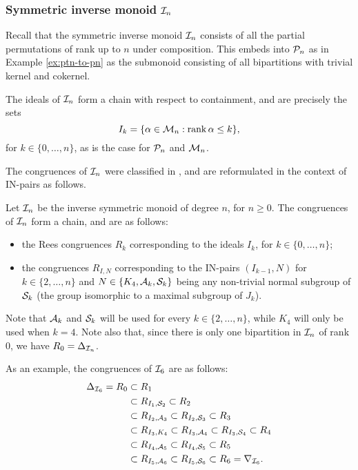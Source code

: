 \subsubsection{Symmetric inverse monoid $\mathcal{I}_n$}
Recall that the symmetric inverse monoid $\mathcal{I}_n$ consists of all the partial
permutations of rank up to $n$ under composition.  This embeds into $\mathcal{P}_n$ as
in Example \ref{ex:ptn-to-pn} as the submonoid consisting of all bipartitions
with trivial kernel and cokernel.

The ideals of $\mathcal{I}_n$ form a chain with respect to containment, and are precisely
the sets $$I_k=\{\alpha \in \mathcal{M}_n : \operatorname{rank} \alpha \leq k\},$$ for
$k \in \{0, \ldots, n\}$, as is the case for $\mathcal{P}_n$ and $\mathcal{M}_n$.

The congruences of $\mathcal{I}_n$ were classified in \cite{liber_1953}, and are
reformulated in the context of IN-pairs as follows.
\begin{theorem}
  \label{thm:in-congs}
  Let $\mathcal{I}_n$ be the inverse symmetric monoid of degree $n$, for $n \geq 0$.  The
  congruences of $\mathcal{I}_n$ form a chain, and are as follows:
  \begin{itemize}
  \item the Rees congruences $R_k$ corresponding to the ideals $I_k$, for
    $k \in \{0, \ldots, n\}$;
  \item the congruences $R_{I,N}$ corresponding to the IN-pairs $(I_{k-1}, N)$
    for $k \in \{2, \ldots, n\}$ and $N \in \{K_4, \mathcal{A}_k, \mathcal{S}_k\}$ being any
    non-trivial normal subgroup of $\mathcal{S}_k$ (the group isomorphic to a maximal
    subgroup of $J_k$).
  \end{itemize}
\end{theorem}
Note that $\mathcal{A}_k$ and $\mathcal{S}_k$ will be used for every $k \in \{2, \ldots, n\}$,
while $K_4$ will only be used when $k=4$.  Note also that, since there is only
one bipartition in $\mathcal{I}_n$ of rank $0$, we have $R_0 = \Delta_{\mathcal{I}_n}$.

As an example, the congruences of $\mathcal{I}_6$ are as follows:
\begin{align*}
  \Delta_{\mathcal{I}_6} = R_0 & \subset R_1 \\
      & \subset R_{I_1,\mathcal{S}_2} \subset R_2 \\
      & \subset R_{I_2,\mathcal{A}_3} \subset R_{I_2, \mathcal{S}_3} \subset R_3 \\
      & \subset R_{I_3,K_4} \subset R_{I_3,\mathcal{A}_4} \subset R_{I_3, \mathcal{S}_4} \subset R_4 \\
      & \subset R_{I_4,\mathcal{A}_5} \subset R_{I_4, \mathcal{S}_5} \subset R_5 \\
      & \subset R_{I_5,\mathcal{A}_6} \subset R_{I_5, \mathcal{S}_6} \subset R_6 = \nabla_{\mathcal{I}_6}.
\end{align*}

